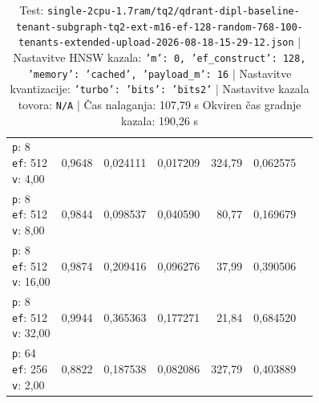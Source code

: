 \begin{table}[htbp]
\begin{tabularx}{\textwidth}{Xrrrrrr}
    \makecell{\texttt{p}: 8\\\texttt{ef}: 512\\\texttt{v}: 4,00} & 0,9648 & 0,024111 & 0,017209 & 324,79 & 0,062575 \\
    \makecell{\texttt{p}: 8\\\texttt{ef}: 512\\\texttt{v}: 8,00} & 0,9844 & 0,098537 & 0,040590 & 80,77 & 0,169679 \\
    \makecell{\texttt{p}: 8\\\texttt{ef}: 512\\\texttt{v}: 16,00} & 0,9874 & 0,209416 & 0,096276 & 37,99 & 0,390506 \\
    \makecell{\texttt{p}: 8\\\texttt{ef}: 512\\\texttt{v}: 32,00} & 0,9944 & 0,365363 & 0,177271 & 21,84 & 0,684520 \\
    \makecell{\texttt{p}: 64\\\texttt{ef}: 256\\\texttt{v}: 2,00} & 0,8822 & 0,187538 & 0,082086 & 327,79 & 0,403889 \\
    \bottomrule
  \end{tabularx}
\caption* {Test: \texttt{single-2cpu-1.7ram/tq2/qdrant-dipl-baseline-tenant-subgraph-tq2-ext-m16-ef-128-random-768-100-tenants-extended-upload-2026-08-18-15-29-12.json} | Nastavitve HNSW kazala: \texttt{{'m': 0, 'ef\_construct': 128, 'memory': 'cached', 'payload\_m': 16}} | Nastavitve kvantizacije: \texttt{{'turbo': {'bits': 'bits2'}}} | Nastavitve kazala tovora: \texttt{N/A} | Čas nalaganja: 107,79 s Okviren čas gradnje kazala: 190,26 s}\end{table}


